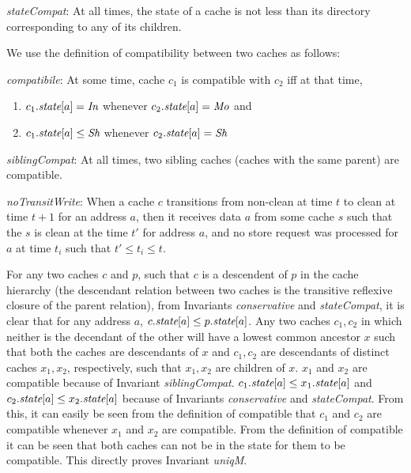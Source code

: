 \begin{inv}
\textit{stateCompat}: At all times, the state of a cache is not less than its
directory corresponding to any of its children.
\label{stateCompat}
\end{inv}

We use the definition of compatibility between two caches as follows:
\begin{defn}
\textit{compatibile}: At some time, cache $c_1$ is compatible with $c_2$ iff
at that time,
\begin{enumerate}
\item $c_1.\textit{state}[a] = \textit{In}$ whenever $c_2.\textit{state}[a] = \textit{Mo}$ and
\item $c_1.\textit{state}[a] \le \textit{Sh}$ whenever $c_2.\textit{state}[a] = \textit{Sh}$
\end{enumerate}
\label{compatible}
\end{defn}

\begin{inv}
\textit{siblingCompat}: At all times, two sibling caches (\ie caches with the
same parent) are compatible.
\label{siblingCompat}
\end{inv}

\begin{inv}
\textit{noTransitWrite}: When a cache $c$ transitions from non-clean at time
$t$ to clean at time $t+1$ for an address $a$, then it receives data $a$ from
some cache $s$ such that the $s$ is clean at the time $t'$ for address $a$, and
no store request was processed for $a$ at time $t_i$ such that $t' \le t_i \le
t$.
\label{noTransitWrite}
\end{inv}

For any two caches $c$ and $p$, such that $c$ is a descendent of $p$ in the cache
hierarchy (the descendant relation between two caches is the transitive
reflexive closure of the parent relation), from Invariants
\textit{conservative} and \textit{stateCompat}, it is clear that for any
address $a$, $c.\textit{state}[a] \le p.\textit{state}[a]$. Any two caches $c_1, c_2$ in which
neither is the decendant of the other will have a lowest common ancestor $x$
such that both the caches are descendants of $x$ and $c_1, c_2$ are descendants
of distinct caches $x_1, x_2$, respectively, such that $x_1, x_2$ are children
of $x$. $x_1$ and $x_2$ are compatible because of Invariant
\textit{siblingCompat}. $c_1.\textit{state}[a] \le x_1.\textit{state}[a]$ and
$c_2.\textit{state}[a] \le x_2.\textit{state}[a]$ because of Invariants \textit{conservative}
and \textit{stateCompat}. From this, it can easily be seen from the definition
of compatible that $c_1$ and $c_2$ are compatible whenever $x_1$ and $x_2$ are
compatible. From the definition of compatible it can be seen that both caches can not
be in the \Mo{} state for them to be compatible. This directly proves Invariant
\textit{uniqM}.

